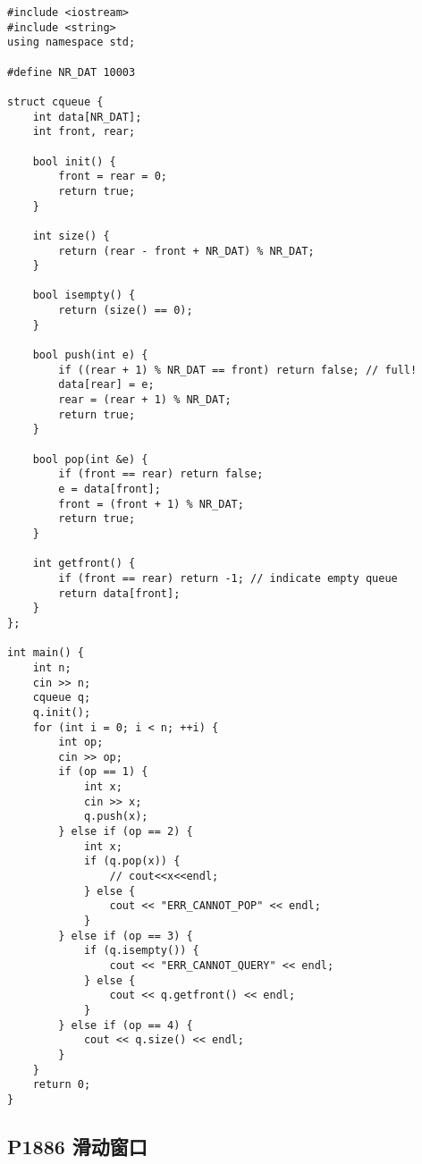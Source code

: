 \documentclass{ctexart}
\begin{document}
\begin{lstlisting}
#include <iostream>
#include <string>
using namespace std;

#define NR_DAT 10003

struct cqueue {
    int data[NR_DAT];
    int front, rear;

    bool init() {
        front = rear = 0;
        return true;
    } 

    int size() {
        return (rear - front + NR_DAT) % NR_DAT;
    }

    bool isempty() {
        return (size() == 0);
    }

    bool push(int e) {
        if ((rear + 1) % NR_DAT == front) return false; // full!
        data[rear] = e;
        rear = (rear + 1) % NR_DAT;
        return true;
    }
    
    bool pop(int &e) {
        if (front == rear) return false;
        e = data[front];
        front = (front + 1) % NR_DAT;
        return true;
    }

    int getfront() {
        if (front == rear) return -1; // indicate empty queue
        return data[front];
    }
};

int main() {
    int n;
    cin >> n;
    cqueue q;
    q.init();
    for (int i = 0; i < n; ++i) {
        int op;
        cin >> op;
        if (op == 1) {
            int x;
            cin >> x;
            q.push(x);
        } else if (op == 2) {
            int x;
            if (q.pop(x)) {
                // cout<<x<<endl; 
            } else {
                cout << "ERR_CANNOT_POP" << endl;
            }
        } else if (op == 3) {
            if (q.isempty()) {
                cout << "ERR_CANNOT_QUERY" << endl;
            } else {
                cout << q.getfront() << endl;
            }
        } else if (op == 4) {
            cout << q.size() << endl;
        }
    }
    return 0;
}

\end{lstlisting}

\subsection{P1886 滑动窗口}
\end{document}
